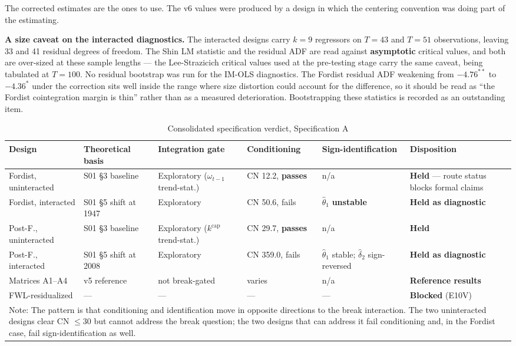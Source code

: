 \documentclass[11pt,a4paper]{article}
\begin{document}
The corrected estimates are the ones to use. The v6 values were produced by a design in which the centering convention was doing part of the estimating.

\textbf{A size caveat on the interacted diagnostics.} The interacted designs carry $k = 9$ regressors on $T = 43$ and $T = 51$ observations, leaving 33 and 41 residual degrees of freedom. The Shin LM statistic and the residual ADF are read against \textbf{asymptotic} critical values, and both are over-sized at these sample lengths --- the Lee-Strazicich critical values used at the pre-testing stage carry the same caveat, being tabulated at $T = 100$. No residual bootstrap was run for the IM-OLS diagnostics. The Fordist residual ADF weakening from $-4.76^{**}$ to $-4.36^{*}$ under the correction sits well inside the range where size distortion could account for the difference, so it should be read as ``the Fordist cointegration margin is thin'' rather than as a measured deterioration. Bootstrapping these statistics is recorded as an outstanding item.

\begin{table}[H]
\centering
\caption{Consolidated specification verdict, Specification A}
\label{tab:specA_verdict}
\footnotesize
\begin{tabular}{p{2.5cm}p{2.2cm}p{2.4cm}p{1.9cm}p{2.3cm}p{2.6cm}}
\toprule
Design & Theoretical basis & Integration gate & Conditioning & Sign-identification & Disposition \\
\midrule
Fordist, uninteracted & S01 \S3 baseline & Exploratory ($\omega_{t-1}$ trend-stat.) & CN 12.2, \textbf{passes} & n/a & \textbf{Held} --- route status blocks formal claims \\
Fordist, interacted & S01 \S5 shift at 1947 & Exploratory & CN 50.6, fails & $\hat{\theta}_1$ \textbf{unstable} & \textbf{Held as diagnostic} \\
Post-F., uninteracted & S01 \S3 baseline & Exploratory ($k^{\text{cap}}$ trend-stat.) & CN 29.7, \textbf{passes} & n/a & \textbf{Held} \\
Post-F., interacted & S01 \S5 shift at 2008 & Exploratory & CN 359.0, fails & $\hat{\theta}_1$ stable; $\hat{\delta}_2$ sign-reversed & \textbf{Held as diagnostic} \\
Matrices A1--A4 & v5 reference & not break-gated & varies & n/a & \textbf{Reference results} \\
FWL-residualized & --- & --- & --- & --- & \textbf{Blocked} (E10V) \\
\bottomrule
\multicolumn{6}{p{15.5cm}}{\footnotesize Note: The pattern is that conditioning and identification move in opposite directions to the break interaction. The two uninteracted designs clear CN $\le 30$ but cannot address the break question; the two designs that can address it fail conditioning and, in the Fordist case, fail sign-identification as well.}
\end{tabular}
\end{table}
\end{document}
